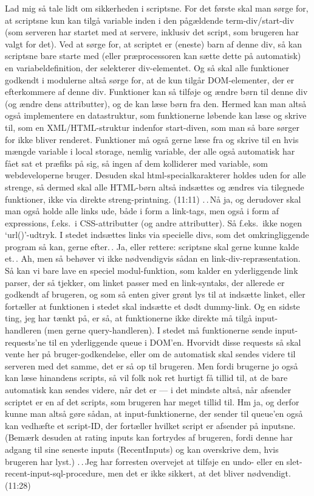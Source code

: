 \documentclass{report}
\begin{document}
Lad mig så tale lidt om sikkerheden i scriptsne. For det første skal man sørge for, at scriptsne kun kan tilgå variable inden i den pågældende term-div/start-div (som serveren har startet med at servere, inklusiv det script, som brugeren har valgt for det). Ved at sørge for, at scriptet er (eneste) barn af denne div, så kan scriptsne bare starte med (eller præprocessoren kan sætte dette på automatisk) en variabeldefinition, der selekterer div-elementet. Og så skal alle funktioner godkendt i modulerne altså sørge for, at de kun tilgår DOM-elementer, der er efterkommere af denne div. Funktioner kan så tilføje og ændre børn til denne div (og ændre dens attributter), og de kan læse børn fra den. Hermed kan man altså også implementere en datastruktur, som funktionerne løbende kan læse og skrive til, som en XML/HTML-struktur indenfor start-diven, som man så bare sørger for ikke bliver renderet. Funktioner må også gerne læse fra og skrive til en hvis mængde variable i local storage, nemlig variable, der alle også automatisk har fået sat et præfiks på sig, så ingen af dem kolliderer med variable, som webdeveloperne bruger. Desuden skal html-specialkarakterer holdes uden for alle strenge, så dermed skal alle HTML-børn altså indsættes og ændres via tilegnede funktioner, ikke via direkte streng-printning. (11:11) .\,.\,Nå ja, og derudover skal man også holde alle links ude, både i form a link-tags, men også i form af expressions, f.eks.\ i CSS-attributter (og andre attributter). Så f.eks.\ ikke nogen `url()'-udtryk. I stedet indsættes links via specielle divs, som det omkringliggende program så kan, gerne efter.\,. Ja, eller rettere: scriptsne skal gerne kunne kalde et.\,. Ah, men så behøver vi ikke nødvendigvis sådan en link-div-repræsentation. Så kan vi bare lave en speciel modul-funktion, som kalder en yderliggende link parser, der så tjekker, om linket passer med en link-syntaks, der allerede er godkendt af brugeren, og som så enten giver grønt lys til at indsætte linket, eller fortæller at funktionen i stedet skal indsætte et dødt dummy-link. Og en sidste ting, jeg har tænkt på, er så, at funktionerne ikke direkte må tilgå input-handleren (men gerne query-handleren). I stedet må funktionerne sende input-requests'ne til en yderliggende queue i DOM'en. Hvorvidt disse requests så skal vente her på bruger-godkendelse, eller om de automatisk skal sendes videre til serveren med det samme, det er så op til brugeren. Men fordi brugerne jo også kan læse hinandens scripts, så vil folk nok ret hurtigt få tillid til, at de bare automatisk kan sendes videre, når det er --- i det mindste altså, når afsender scriptet er en af det scripts, som brugeren har meget tillid til. Hm ja, og derfor kunne man altså gøre sådan, at input-funktionerne, der sender til queue'en også kan vedhæfte et script-ID, der fortæller hvilket script er afsender på inputsne. (Bemærk desuden at rating inputs kan fortrydes af brugeren, fordi denne har adgang til sine seneste inputs (RecentInputs) og kan overskrive dem, hvis brugeren har lyst.) .\,.\,Jeg har forresten overvejet at tilføje en undo- eller en slet-recent-input-sql-procedure, men det er ikke sikkert, at det bliver nødvendigt. (11:28)
\end{document}
